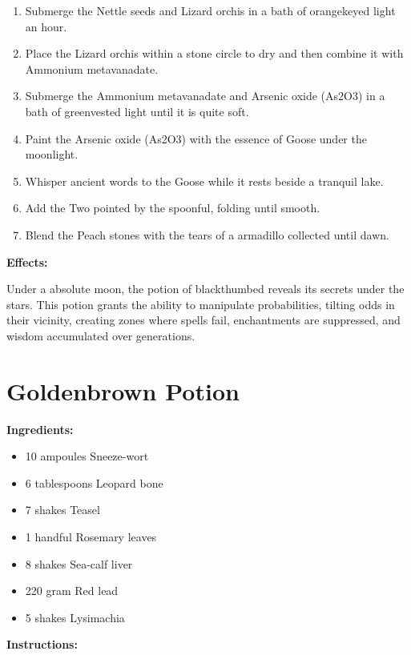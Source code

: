 \documentclass{article}
\begin{document}
\begin{enumerate}
  \item Submerge the Nettle seeds and Lizard orchis in a bath of orangekeyed light an hour.
  \item Place the Lizard orchis within a stone circle to dry and then combine it with Ammonium metavanadate.
  \item Submerge the Ammonium metavanadate and Arsenic oxide (As2O3) in a bath of greenvested light until it is quite soft.
  \item Paint the Arsenic oxide (As2O3) with the essence of Goose under the moonlight.
  \item Whisper ancient words to the Goose while it rests beside a tranquil lake.
  \item Add the Two pointed by the spoonful, folding until smooth.
  \item Blend the Peach stones with the tears of a armadillo collected until dawn.
\end{enumerate}

\textbf{Effects:}

Under a absolute moon, the potion of blackthumbed reveals its secrets under the stars. This potion grants the ability to manipulate probabilities, tilting odds in their vicinity, creating zones where spells fail, enchantments are suppressed, and wisdom accumulated over generations.

\newpage
\section*{Goldenbrown Potion}

\textbf{Ingredients:}

\begin{itemize}
  \item 10 ampoules Sneeze-wort
  \item 6 tablespoons Leopard bone
  \item 7 shakes Teasel
  \item 1 handful Rosemary leaves
  \item 8 shakes Sea-calf liver
  \item 220 gram Red lead
  \item 5 shakes Lysimachia
\end{itemize}

\textbf{Instructions:}
\end{document}
